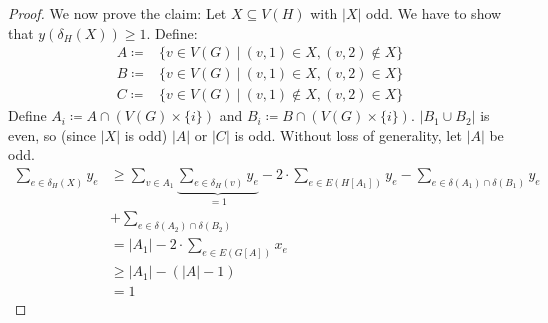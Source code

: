 \documentclass[11pt, a4paper]{article}
\newcommand{\abs}[1]{\left\lvert#1\right\rvert}
\newcommand{\set}[1]{\{#1\}}
\theoremstyle{remark}
\theoremstyle{definition}
\begin{document}
\begin{proof}
	We now prove the claim: Let $X\subseteq V(H)$ with $\abs{X}$ odd. We
	have to show that $y(\delta_H(X))\geq1$. Define:
	\begin{align*}
		A\coloneqq & \set{v\in V(G)\ |\ (v,1)\in X,(v,2)\notin X} \\
		B\coloneqq & \set{v\in V(G)\ |\ (v,1)\in X, (v,2)\in X}   \\
		C\coloneqq & \set{v\in V(G)\ |\ (v,1)\notin X,(v,2)\in X}
	\end{align*}
	Define $A_i\coloneqq A\cap (V(G)\times \set{i})$ and $B_i\coloneqq B\cap
		(V(G)\times \set{i})$. $\abs{B_1\cup B_2}$ is even, so (since $\abs{X}$ is
	odd) $\abs{A}$ or $\abs{C}$ is odd. Without loss of generality, let $\abs{A}$
	be odd.
	\begin{align*}
		\sum_{e\in\delta_H(X)}y_e
		 & \geq \sum_{v\in A_1}\underbrace{\sum_{e\in\delta_H(v)}y_e}_{=1}
		-2\cdot\sum_{e\in E(H[A_1])}y_e-\sum_{e\in \delta(A_1)\cap\delta(B_1)}y_e \\
		 & +\sum_{e\in \delta(A_2)\cap\delta(B_2)}                                \\
		 & =\abs{A_1}-2\cdot\sum_{e\in E(G[A])}x_e                                \\
		 & \geq \abs{A_1}-(\abs{A}-1)                                             \\
		 & =1
	\end{align*}

\end{proof}
\end{document}
